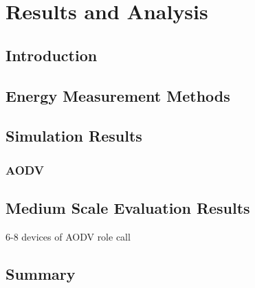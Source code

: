 \chapter{Results and Analysis}

    \section{Introduction}

    \section{Energy Measurement Methods}

    \section{Simulation Results}
      \subsection{AODV}

    \section{Medium Scale Evaluation Results}
    6-8 devices of AODV role call

    \section{Summary}

